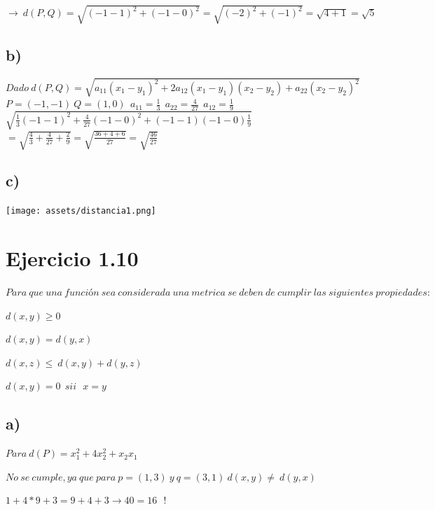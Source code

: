 \documentclass[
]{article}
\begin{document}
\(\rightarrow\ d\left(P,Q\right)=\sqrt{\left(-1-1\right)^2+\left(-1-0\right)^2}=\sqrt{\left(-2\right)^2+\left(-1\right)^2}=\sqrt{4+1}=\sqrt5\)

\hypertarget{b-3}{%
\subsection{b)}\label{b-3}}

\(Dado\ d\left(P,Q\right)=\sqrt{a_{11}\left(x_1-y_1\right)^2+2a_{12}\left(x_1-y_1\right)\left(x_2-y_2\right)+{a_{22}\left(x_2-y_2\right)}^2}\)
\(P=\left(-1,-1\right)\ Q=\left(1,0\right)\ \ a_{11}=\frac{1}{3}\ \ a_{22}=\frac{4}{27}\ \ a_{12}=\frac{1}{9}\)
\(\sqrt{{\frac{1}{3}\left(-1-1\right)}^2+\frac{4}{27}\left(-1-0\right)^2+\left(-1-1\right)\left(-1-0\right)\frac{1}{9}}\)
\(=\sqrt{\frac{4}{3}+\frac{4}{27}+\frac{2}{9}}=\sqrt{\frac{36+4+6}{27}}=\sqrt{\frac{46}{27}}\)

\hypertarget{c-1}{%
\subsection{c)}\label{c-1}}

\texttt{[image: assets/distancia1.png]}

\hypertarget{ejercicio-1.10}{%
\section{Ejercicio 1.10}\label{ejercicio-1.10}}

\(Para\ que\ una\ función\ sea\ considerada\ una\ metrica\ se\ deben\ de\ cumplir\ las\ siguientes\ propiedades:\)

\(d\left(x,y\right)\geq0\)

\(d\left(x,y\right)=d\left(y,x\right)\)

\(d\left(x,z\right)\le\ d\left(x,y\right)+d\left(y,z\right)\)

\(d\left(x,y\right)=0\ \ sii\ \ \ x=y\)

\hypertarget{a-4}{%
\subsection{a)}\label{a-4}}

\(Para\ d\left(P\right)=x_1^2+4x_2^2+x_2x_1\)

\(No\ se\ cumple,ya\ que\ para\ p=\left(1,3\right)\ y\ q=\left(3,1\right)\ d\left(x,y\right)\neq\ d\left(y,x\right)\)

\(1+4\ast9+3=9+4+3\rightarrow40=16\ \ \ !\)
\end{document}
